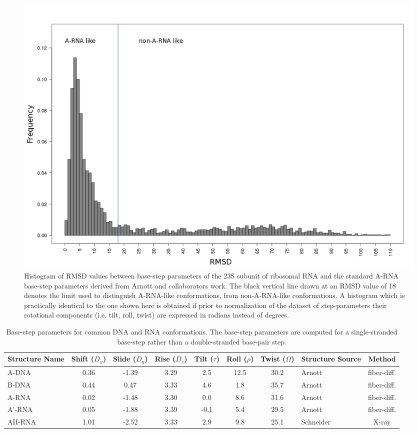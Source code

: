 \begin{figure}[ht]
 \centering
\includegraphics[angle=0, scale=0.38]{Chapter2/dormsd.png}
\caption{Histogram of RMSD values  between base-step parameters of the
23S  subunit  of  ribosomal  RNA  and  the  standard  A-RNA  base-step
parameters  derived from  Arnott  and collaborators  \cite{arnott1973}
work. The black vertical line drawn at an RMSD value of 18 denotes the
limit   used    to   distinguish   A-RNA-like    conformations,   from
non-A-RNA-like  conformations.   A   histogram  which  is  practically
identical to the one shown  here is obtained if prior to normalization
of  the   dataset  of  step-parameters   their  rotational  components
(i.e. tilt, roll, twist) are expressed in radians instead of degrees.}
\label{fig:dormsd}
\end{figure}

\begin{table}[ht]
\centering
\small\addtolength{\tabcolsep}{-2pt}
\begin{tabular}{p{1.4cm}|c|c|c|c|c|c|p{2.2cm}|c}
\hline
\textbf{Structure Name} & Shift ($D_x$) & Slide ($D_y$) & Rise ($D_z$) & Tilt
($\tau$) & Roll ($\rho$) & Twist ($\Omega$) & \textbf{Structure Source} &
\textbf{Method} \\ \hline
A-DNA & 0.36 & -1.39 & 3.29 & 2.5 & 12.5 & 30.2 & Arnott
\cite{arnott1999} & fiber-diff. \\ \hline
B-DNA & 0.44 & 0.47 & 3.33 & 4.6 & 1.8 & 35.7   & Arnott
\cite{arnott1999} & fiber-diff. \\ \hline
A-RNA & 0.02 & -1.48 & 3.30 & 0.0 & 8.6 & 31.6 & Arnott
\cite{arnott1999} & fiber-diff. \\ \hline
A'-RNA & 0.05 & -1.88 & 3.39 & -0.1 & 5.4 & 29.5 & Arnott
\cite{arnott1999} & fiber-diff. \\ \hline
AII-RNA & 1.01 & -2.52 & 3.33 & 2.9 & 9.8 & 25.1 & Schneider
\cite{schneider2004} & X-ray \\ \hline
\end{tabular}
\caption{Base-step   parameters    for   common    DNA    and   RNA
  conformations.   The  base-step  parameters   are  computed   for  a
  single-stranded  base-step rather  than a  double-stranded base-pair
  step.}
\label{tab:conf}
\end{table}

